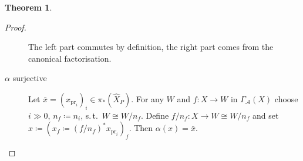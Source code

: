 \documentclass[english]{scrartcl}
\theoremstyle{definition}
\newtheorem*{Thm}{Theorem}
\theoremstyle{remark}
\newcommand*{\suchthat}{s.\,t.\ }
\newcommand*{\Ps}{P}  %
\newcommand*{\pistar}[2][*]{\pi_{#1}(#2)}  %
\newcommand*{\compl}[2][\Ps]{\hat{#2}_{#1}}  %
\newcommand*{\A}{\mathcal{A}}  %
\begin{document}
\begin{Thm}
\begin{proof}
\begin{description}
\begin{center}
      \end{center}
      The left part commutes by definition, the right part comes from
      the canonical factorisation.
    \item[$\alpha$ surjective] Let
      $\bar x=(x_{\text{pr}_i})_i\in\pistar{\compl X}$.
      For any $W$ and $f\colon X\to W$ in $\Gamma_\A(X)$ choose $i\gg0$,
      $n_f\coloneqq n_i$, \suchthat $W\cong W/n_f$.
      Define $f/n_f\colon X\to W\cong W/n_f$
      and set $x\coloneqq (x_f\coloneqq (f/n_f)^*x_{\text{pr}_i})_f$.
      Then $\alpha(x)=\bar x$.
      \qedhere
    \end{description}
  \end{proof}
\end{Thm}

\nocite{*}
\printbibliography
\end{document}
